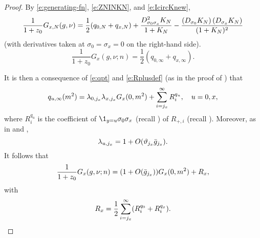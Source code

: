 \begin{proof}
By \eqref{e:generating-fn}, \eqref{e:ZNINKN}, and \eqref{e:IcircKnew},
\begin{equation}
\lbeq{GK}
\frac{1}{1+z_0} G_{x,N}(g, \nu)
	=
\frac{1}{2} (q_{0,N} + q_{x,N})
	+
\frac{D^2_{\sigma_0\sigma_x}K_{N}}{1 + K_{N}}
	-
\frac{\left(D_{\sigma_0}K_{N}\right) \left(D_{\sigma_x}K_{N}\right)}{(1 + K_{N})^2}
\end{equation}
(with derivatives taken at $\sigma_0=\sigma_x=0$ on the right-hand side).
\begin{equation}
\frac{1}{1+z_0} G_x(g, \nu; n) = \frac{1}{2} (q_{0,\infty} + q_{x,\infty}).
\end{equation}

It is then a consequence of
\eqref{e:qpt} and \eqref{e:Rplusdef} (as in the proof of \cite[Lemma~\ref{phi4-lem:qflow}]{ST-phi4}) that
\begin{equation}
\label{e:q}
q_{u,\infty}(m^2)
= \lambda_{0, j_x} \lambda_{x, j_x}  G_x(0, m^2) + \sum_{i = j_x}^\infty R^{q_u}_i,
\quad u = 0, x,
\end{equation}
where $R^{q_u}_i$ is the coefficient of $\1_{y=u}\sigma_0\sigma_x$ (recall )
of $R_{+,i}$ (recall ).
Moreover, as in \cite[\eqref{phi4-e:lam-star}]{ST-phi4} and \cite[Corollary~\ref{phi4-cor:vx}]{ST-phi4},
\begin{equation}
\lambda_{u,j_x} = 1 + O(\vartheta_{j_x} \bar{g}_{j_x}).
\end{equation}
It follows that
\begin{equation}
\frac{1}{1+z_0} G_x(g, \nu; n) = (1 + O(\bar{g}_{j_x})) G_x(0, m^2) + R_x,
\end{equation}
with
\begin{equation}
\label{e:Rabdef}
R_x = \frac{1}{2} \sum_{i=j_x}^\infty (R^{q_0}_i + R^{q_x}_i).
\end{equation}


\end{proof}
